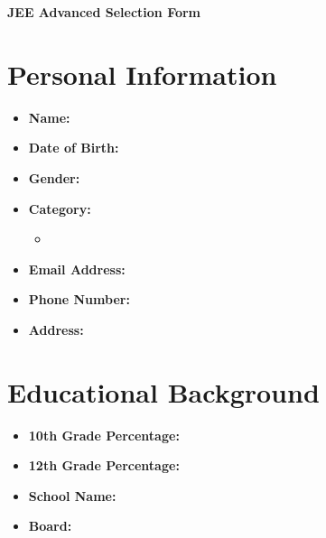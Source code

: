 \documentclass{article}
\begin{document}
\begin{center}

    
    \textbf{\huge JEE Advanced Selection Form}
\end{center}

\section*{Personal Information}
\begin{itemize}[leftmargin=*, label={}, itemsep=5pt]
    \item \textbf{Name:} \underline{\hspace{8cm}}
    \item \textbf{Date of Birth:} \underline{\hspace{8cm}}
    \item \textbf{Gender:} \underline{\hspace{8cm}}
    \item \textbf{Category:} 
        \begin{itemize}[label={\CheckBox[bordercolor = 1 1 1, ][checked]{}}]
            \item {} \hspace{0.5cm}   \hspace{0.5cm}   \hspace{0.5cm}  
        \end{itemize}
    \item \textbf{Email Address:} \underline{\hspace{8cm}}
    \item \textbf{Phone Number:} \underline{\hspace{8cm}}
    \item \textbf{Address:} \underline{\hspace{8cm}}
\end{itemize}

\section*{Educational Background}
\begin{itemize}[leftmargin=*, label={}, itemsep=5pt]
    \item \textbf{10th Grade Percentage:} \underline{\hspace{8cm}}
    \item \textbf{12th Grade Percentage:} \underline{\hspace{8cm}}
    \item \textbf{School Name:} \underline{\hspace{8cm}}
    \item \textbf{Board:} \underline{\hspace{8cm}}
\end{itemize}
\end{document}
